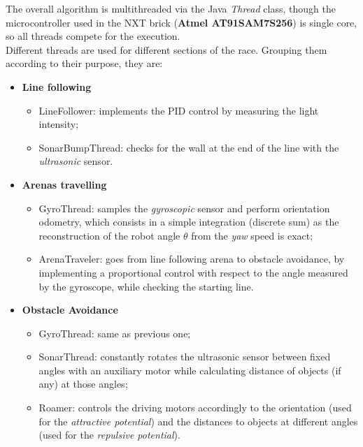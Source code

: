 \documentclass[a4paper,11pt,oneside]{book}
\begin{document}
			The overall algorithm is multithreaded via the Java \textit{Thread} class, though the microcontroller used in the NXT brick (\textbf{Atmel AT91SAM7S256}) is single core, so all threads compete for the execution.\\
			
			Different threads are used for different sections of the race. Grouping them according to their purpose, they are:
			
			\begin{itemize}
				\item \textbf{Line following}
					\begin{itemize}
							\item LineFollower: implements the PID control by measuring the light intensity;
						\item SonarBumpThread: checks for the wall at the end of the line with the \textit{ultrasonic} sensor.
					\end{itemize}
				
				\item \textbf{Arenas travelling}
				\begin{itemize}
						\item GyroThread: samples the \textit{gyroscopic} sensor and perform orientation odometry, which consists in a simple integration (discrete sum) as the reconstruction of the robot angle $\theta$ from the \textit{yaw} speed is exact;
					\item ArenaTraveler: goes from line following arena to obstacle avoidance, by implementing a proportional control with respect to the angle measured by the gyroscope, while checking the starting line.
				\end{itemize}
			
				
				\item \textbf{Obstacle Avoidance}
				\begin{itemize}
					\item GyroThread: same as previous one;
					\item SonarThread: constantly rotates the ultrasonic sensor between fixed angles with an auxiliary motor while calculating distance of objects (if any) at those angles;
					\item Roamer: controls the driving motors accordingly to the orientation (used for the \textit{attractive potential}) and the distances to objects at different angles (used for the \textit{repulsive potential}).
				\end{itemize}
				
			\end{itemize}
			\vspace{7mm}
			
\end{document}
